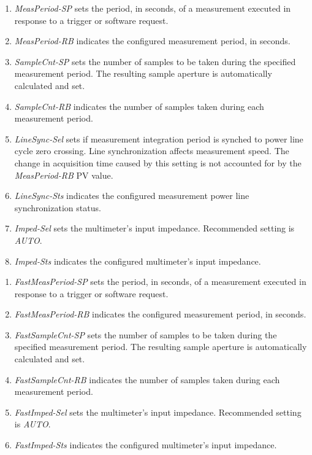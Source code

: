 \documentclass[openany]{article}
\begin{document}
			\begin{enumerate}
				\item \emph{MeasPeriod-SP} sets the period, in seconds, of a measurement executed in response to a trigger or software request.
				\item \emph{MeasPeriod-RB} indicates the configured measurement period, in seconds.
				\item \emph{SampleCnt-SP} sets the number of samples to be taken during the specified measurement period. The resulting sample aperture is automatically calculated and set.
				\item \emph{SampleCnt-RB} indicates the number of samples taken during each measurement period.
				\item \emph{LineSync-Sel} sets if measurement integration period is synched to power line cycle zero crossing. Line synchronization affects measurement speed. The change in acquisition time caused by this setting is not accounted for by the \emph{MeasPeriod-RB} PV value.
				\item \emph{LineSync-Sts} indicates the configured measurement power line synchronization status.
				\item \emph{Imped-Sel} sets the multimeter's input impedance. Recommended setting is \emph{AUTO}.
				\item \emph{Imped-Sts} indicates the configured multimeter's input impedance.
			\end{enumerate}

			\noindent{}

			\begin{enumerate}
				\item \emph{FastMeasPeriod-SP} sets the period, in seconds, of a measurement executed in response to a trigger or software request.
				\item \emph{FastMeasPeriod-RB} indicates the configured measurement period, in seconds.
				\item \emph{FastSampleCnt-SP} sets the number of samples to be taken during the specified measurement period. The resulting sample aperture is automatically calculated and set.
				\item \emph{FastSampleCnt-RB} indicates the number of samples taken during each measurement period.
				\item \emph{FastImped-Sel} sets the multimeter's input impedance. Recommended setting is \emph{AUTO}.
				\item \emph{FastImped-Sts} indicates the configured multimeter's input impedance.
			\end{enumerate}
\end{document}
